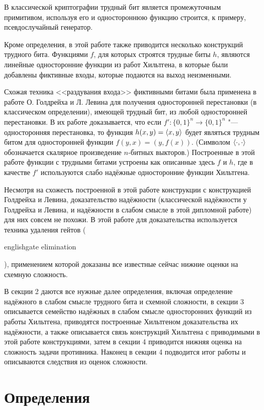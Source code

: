 \documentclass[oneside, a4paper]{article}
\theoremstyle{definition}
\theoremstyle{remark}
\DeclarePairedDelimiter\ang{\langle}{\rangle}
\begin{document}
В классической криптографии трудный бит является промежуточным примитивом,
используя его и одностороннюю функцию строится, к примеру, псевдослучайный
генератор.

Кроме определения, в этой работе также приводится несколько конструкций трудного
бита. Функциями $f$, для которых строятся трудные биты $h$, являются линейные
односторонние функции из работ Хильтгена, в которые были добавлены фиктивные
входы, которые подаются на выход неизменными.

Схожая техника <<раздувания входа>> фиктивными битами была применена в работе
О. Голдрейха и Л. Левина \cite{goldreich_levin} для получения односторонней
перестановки (в классическом определении), имеющей трудный бит, из любой
односторонней перестановки. В их работе доказывается, что если $f' : \{0, 1\}^n
\to \{0, 1\}^n$ "--- односторонняя перестановка, то функция $h(x, y) = \ang{x,
y}$ будет являться трудным битом для односторонней функции $f(y, x) = (y,
f(x))$. (Символом $\ang{\cdot, \cdot}$ обозначается скалярное произведение
$n$-битных выкторов.) Построенные в этой работе функции с трудными битами
устроены как описанные здесь $f$ и $h$, где в качестве $f'$ используются слабо
надёжные односторонние функции Хильтгена.

Несмотря на схожесть построенной в этой работе конструкции с конструкцией
Голдрейха и Левина, доказательство надёжности (классической надёжности у
Голдрейха и Левина, и надёжности в слабом смысле в этой дипломной работе) для них
совсем не похожи. В этой работе для доказательства используется техника удаления
гейтов (\begin{foreignlanguage}{english}gate elimination\end{foreignlanguage}),
применением которой доказаны все известные сейчас нижние оценки на схемную
сложность.

В секции 2 даются все нужные далее определения, включая определение
надёжного в слабом смысле трудного бита и схемной сложности, в секции 3
описывается семейство надёжных в слабом смысле односторонних функций из работы
Хильтгена, приводятся построенные Хильтгеном доказательства их надёжности,
а также описывается связь конструкций Хильтгена с приводимыми в этой работе
конструкциями, затем в секции 4 приводится нижняя оценка на сложность задачи
противника. Наконец в секции 4 подводится итог работы и описываются следствия из
оценок сложности.

\section{Определения}
\end{document}
